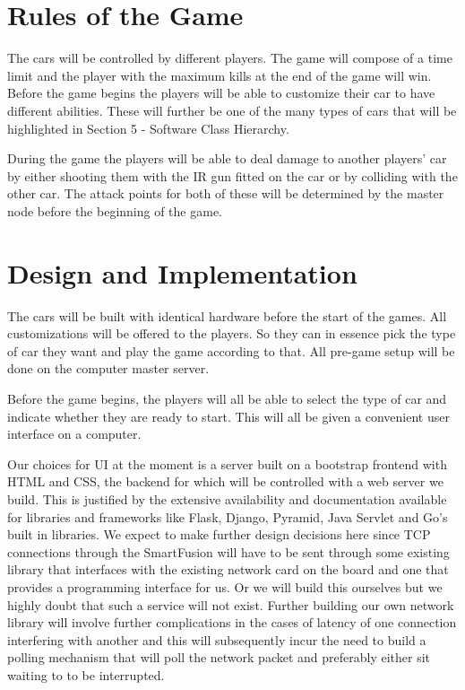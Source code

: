 \documentclass{article}
\begin{document}
\section{Rules of the Game} The cars will be controlled by different players.
The game will compose of a time limit and the player with the maximum kills at
the end of the game will win.  Before the game begins the players will be
able to customize their car to have different abilities.  These will further
be one of the many types of cars that will be highlighted in Section 5 -
Software Class Hierarchy.  

During the game the players will be able to deal damage to another players'
car by either shooting them with the IR gun fitted on the car or by colliding
with the other car.  The attack points for both of these will be determined by
the master node before the beginning of the game.  

\section{Design and Implementation} The cars will be built with identical
hardware before the start of the games.  All customizations will be offered to
the players.  So they can in essence pick the type of car they want and play
the game according to that.  All pre-game setup will be done on the computer
master server. 

Before the game begins, the players will all be able to select the type of car
and indicate whether they are ready to start.  This will all be given a
convenient user interface on a computer. 

Our choices for UI at the moment is a server built on a bootstrap frontend
with HTML and CSS, the backend for which will be controlled with a web server
we build.  This is justified by the extensive availability and documentation
available for libraries and frameworks like Flask, Django, Pyramid, Java
Servlet and Go’s built in libraries.  We expect to make further design
decisions here since TCP connections through the SmartFusion will have to be
sent through some existing library that interfaces with the existing network
card on the board and one that provides a programming interface for us.  Or we
will build this ourselves but we highly doubt that such a service will not
exist.  Further building our own network library will involve further
complications in the cases of latency of one connection interfering with
another and this will subsequently incur the need to build a polling mechanism
that will poll the network packet and preferably either sit waiting to to be
interrupted.
\end{document}
